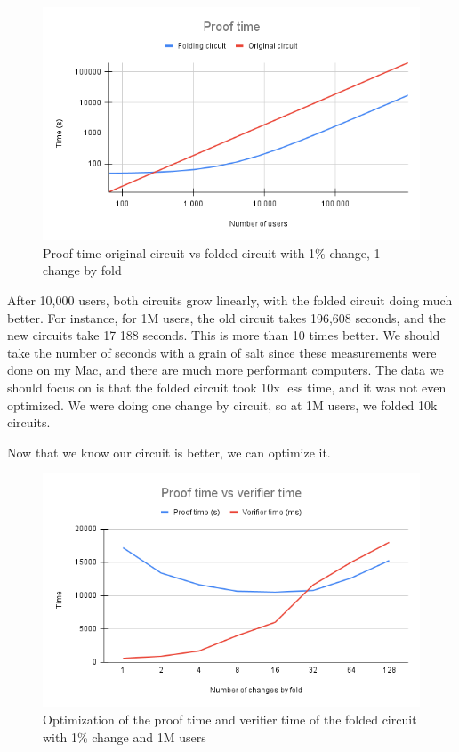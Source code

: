\begin{figure}[H]
   \centering
   \includegraphics[width=130mm]{Proof time.png}
   \caption{Proof time original circuit vs folded circuit with 1\% change, 1 change by fold}
   \label{overflow}
   \end{figure}

After 10,000 users, both circuits grow linearly, with the folded circuit doing much better. For instance,
for 1M users, the old circuit takes 196,608 seconds, and the new circuits take 17 188 seconds. This is more than 10 times better.
We should take the number of seconds with a grain of salt since these measurements were done on my Mac, and there are much more performant computers.
The data we should focus on is that the folded circuit took 10x less time, and it was not even optimized. We were doing one change by circuit, so at 1M users, we folded 10k circuits.

Now that we know our circuit is better, we can optimize it.

\begin{figure}[H]
   \centering
   \includegraphics[width=130mm]{Proof time vs verifier time.png}
   \caption{Optimization of the proof time and verifier time of the folded circuit with 1\% change and 1M users}
   \label{overflow}
   \end{figure}

